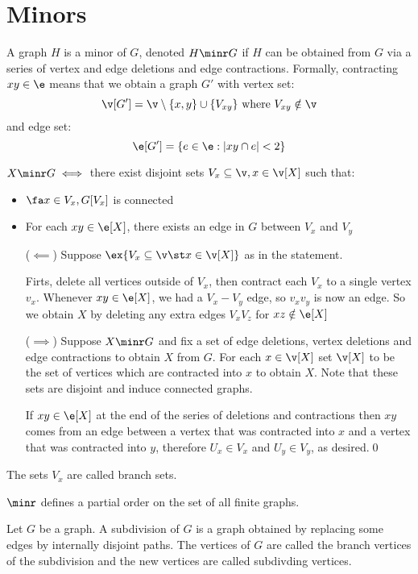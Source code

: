 \section{Minors}
A graph $H$ is a minor of $G$, denoted $H \minr G$ if $H$ can be obtained from $G$ via a series of vertex and edge deletions and edge contractions. Formally, contracting $xy \in \e$ means that we obtain a graph $G'$ with vertex set:
\begin{equation*}
    \v[G'] = \v \setminus \{x, y\} \cup \{V_{xy}\} \text{ where } V_{xy} \notin \v
\end{equation*}
and edge set:
\begin{equation*}
    \e[G'] = \{e \in \e: |xy \cap e| < 2\}
\end{equation*}
\begin{proposition}
    \label{prop:1.25}
    $X \minr G \iff$ there exist disjoint sets $V_x \subseteq \v, x \in \v[X]$ such that:
    \begin{itemize}
        \item $\fa x \in V_x, G[V_x]$ is connected
        \item For each $xy \in \e[X]$, there exists an edge in $G$ between $V_x$ and $V_y$
    \end{itemize}
\end{proposition}
\begin{prf}
    \begin{itemize}
        \item [($\impliedby$)] Suppose $\ex \{V_x \subseteq \v \st x \in \v[X]\}$ as in the statement.
        
        Firts, delete all vertices outside of $V_x$, then contract each $V_x$ to a single vertex $v_x$. Whenever $xy \in \e[X]$, we had a $V_x - V_y$ edge, so $v_xv_y$ is now an edge. So we obtain $X$ by deleting any extra edges $V_xV_z$ for $xz \notin \e[X]$
        \item [($\implies$)] Suppose $X \minr G$ and fix a set of edge deletions, vertex deletions and edge contractions to obtain $X$ from $G$. For each $x \in \v[X]$ set $\v[X]$ to be the set of vertices which are contracted into $x$ to obtain $X$. Note that these sets are disjoint and induce connected graphs.
        
        If $xy \in \e[X]$ at the end of the series of deletions and contractions then $xy$ comes from an edge between a vertex that was contracted into $x$ and a vertex that was contracted into $y$, therefore $U_x \in V_x$ and $U_y \in V_y$, as desired.\qed
    \end{itemize}
\end{prf}
The sets $V_x$ are called branch sets.
\begin{proposition}
    $\minr$ defines a partial order on the set of all finite graphs.
\end{proposition}
Let $G$ be a graph. A subdivision of $G$ is a graph obtained by replacing some edges by internally disjoint paths. The vertices of $G$ are called the branch vertices of the subdivision and the new vertices are called subdivding vertices.

